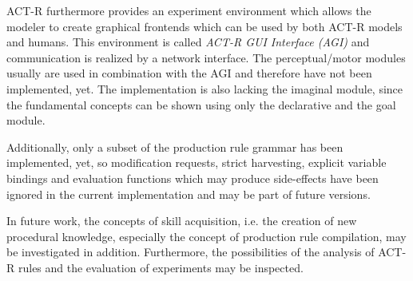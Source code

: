 ACT-R furthermore provides an experiment environment which allows the modeler to create graphical frontends which can be used by both ACT-R models and humans. This environment is called \emph{ACT-R GUI Interface (AGI)} \cite{agi_reference} and communication is realized by a network interface. The perceptual/motor modules usually are used in combination with the AGI and therefore have not been implemented, yet. The implementation is also lacking the imaginal module, since the fundamental concepts can be shown using only the declarative and the goal module.

Additionally, only a subset of the production rule grammar has been implemented, yet, so modification requests, strict harvesting, explicit variable bindings and evaluation functions which may produce side-effects have been ignored in the current implementation and may be part of future versions.

In future work, the concepts of skill acquisition, i.e. the creation of new procedural knowledge, especially the concept of production rule compilation, may be investigated in addition. Furthermore, the possibilities of the analysis of ACT-R rules and the evaluation of experiments may be inspected.
